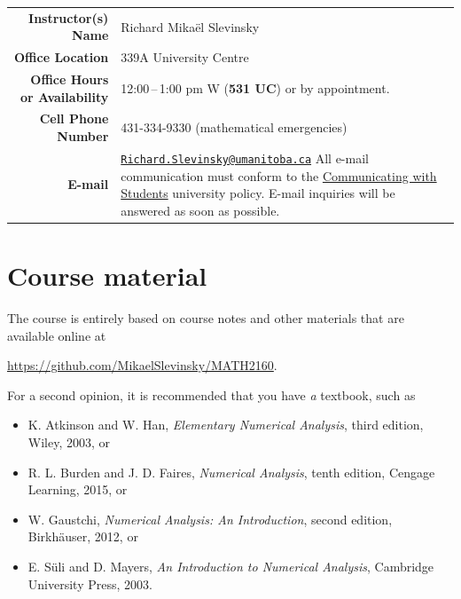 \documentclass[12pt]{article}
\newlength{\infoTableSpace}
\begin{document}
\noindent
\begin{tabular*}{\linewidth}{r@{\hspace{\infoTableSpace}}l}
	\toprule
	\textbf{Instructor(s) Name} 			& Richard Mika\"el Slevinsky 	\\ 
	\textbf{Office Location}				& 339A University Centre	\\
	\textbf{Office Hours or Availability} & 12:00\,--\,1:00 pm W ({\bf 531 UC}) or by appointment.\\
	\textbf{Cell Phone Number} 			& 431-334-9330 (mathematical emergencies) \\
	\textbf{E-mail}	& \begin{minipage}[t]{0.65\linewidth}	
			\href{mailto:Richard.Slevinsky@umanitoba.ca}{\texttt{Richard.Slevinsky@umanitoba.ca}}
			All e-mail communication must conform to the 
			\href{http://umanitoba.ca/admin/governance/media/Electronic_Communication_with_Students_Policy_-_2014_06_05.pdf}{Communicating with Students} university policy. E-mail inquiries will be answered as soon as possible.			
		\end{minipage} \\
	\bottomrule
\end{tabular*}


\section{Course material}

The course is entirely based on course notes and other materials that are available online at

\href{https://github.com/MikaelSlevinsky/MATH2160}{https://github.com/MikaelSlevinsky/MATH2160}.

For a second opinion, it is recommended that you have {\em a} textbook, such as

\begin{itemize}
\item K. Atkinson and W. Han, {\em Elementary Numerical Analysis}, third edition, Wiley, 2003, or
\item R. L. Burden and J. D. Faires, {\em Numerical Analysis}, tenth edition, Cengage Learning, 2015, or
\item W. Gaustchi, {\em Numerical Analysis: An Introduction}, second edition, Birkh\"auser, 2012, or
\item E. S\"uli and D. Mayers, {\em An Introduction to Numerical Analysis}, Cambridge University Press, 2003.
\end{itemize}
\end{document}
